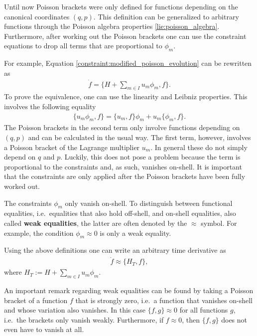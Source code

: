     \begin{method}
        Until now Poisson brackets were only defined for functions depending on the canonical coordinates $(q,p)$. This definition can be generalized to arbitrary functions through the Poisson algebra properties \ref{lie:poisson_algebra}. Furthermore, after working out the Poisson brackets one can use the constraint equations to drop all terms that are proportional to $\phi_m$.

        For example, Equation \eqref{constraint:modified_poisson_evolution} can be rewritten as
        \begin{gather}
            \dot{f} = \{H + \sum_{m\in I}u_m\phi_m,f\}.
        \end{gather}
        To prove the equivalence, one can use the linearity and Leibniz properties. This involves the following equality
        \begin{gather}
            \{u_m\phi_m, f\} = \{u_m,f\}\phi_m + u_m\{\phi_m,f\}.
        \end{gather}
        The Poisson brackets in the second term only involve functions depending on $(q,p)$ and can be calculated in the usual way. The first term, however, involves a Poisson bracket of the Lagrange multiplier $u_m$. In general these do not simply depend on $q$ and $p$. Luckily, this does not pose a problem because the term is proportional to the constraints and, as such, vanishes on-shell. It is important that the constraints are only applied after the Poisson brackets have been fully worked out.
    \end{method}

    \begin{notation}
        The constraints $\phi_m$ only vanish on-shell. To distinguish between functional equalities, i.e.~equalities that also hold off-shell, and on-shell equalities, also called \textbf{weak equalities}, the latter are often denoted by the $\approx$ symbol. For example, the condition $\phi_m\approx0$ is only a weak equality.
    \end{notation}
    Using the above definitions one can write an arbitrary time derivative as
    \begin{gather}
        \dot{f}\approx\{H_T,f\},
    \end{gather}
    where $H_T := H + \sum_{m\in I}u_m\phi_m$.

    \begin{remark}[Closure]
        An important remark regarding weak equalities can be found by taking a Poisson bracket of a function $f$ that is strongly zero, i.e.~a function that vanishes on-shell and whose variation also vanishes. In this case $\{f,g\}\approx0$ for all functions $g$, i.e.~the brackets only vanish weakly. Furthermore, if $f\approx0$, then $\{f,g\}$ does not even have to vanish at all.
    \end{remark}

